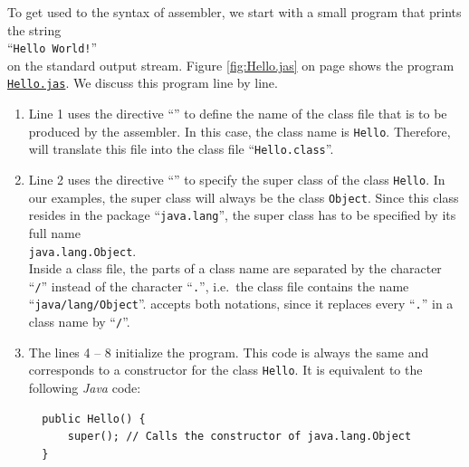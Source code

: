 \noindent
To get used to the syntax of  assembler, we start with a small program that prints the
string
\\[0.2cm]
\hspace*{1.3cm}
``\texttt{Hello World!}''
\\[0.2cm]
on the standard output stream.  Figure \ref{fig:Hello.jas} on page
\pageref{fig:Hello.jas} shows the program
\href{https://github.com/karlstroetmann/Formal-Languages/tree/master/Python/Chapter-12/Hello.jas}{\texttt{Hello.jas}}. 
We discuss this program line by line.
\begin{enumerate}
\item Line 1 uses the directive ``\texttt{}'' to define the name of the class file that is to
      be produced by the assembler.  
      In this case, the class name is \texttt{Hello}.  Therefore,  will translate
      this file into the class file ``\texttt{Hello.class}''.
\item Line 2 uses the directive ``\texttt{}'' to specify the super class of the class
      \texttt{Hello}.  In our examples, the super class will always be the class \texttt{Object}.
      Since this class resides in the package ``\texttt{java.lang}'', the super class has to be
      specified by its full name
      \\[0.2cm]
      \hspace*{1.3cm}
      \texttt{java.lang.Object}.
      \\[0.2cm]
      Inside a class file, the parts of a class name are separated by the character ``\texttt{/}''
      instead of the character ``\texttt{.}'', i.e.~the class file contains the name
      ``\texttt{java/lang/Object}''.   accepts both notations, since it replaces
      every ``\texttt{.}'' in a class name by ``\texttt{/}''.
\item The lines 4 -- 8 initialize the program.  This code is always the same and corresponds to a
  constructor for the class \texttt{Hello}.  It is equivalent to the following \textsl{Java} code:

\begin{verbatim}
  public Hello() {
      super(); // Calls the constructor of java.lang.Object
  }
\end{verbatim}


\end{enumerate}
